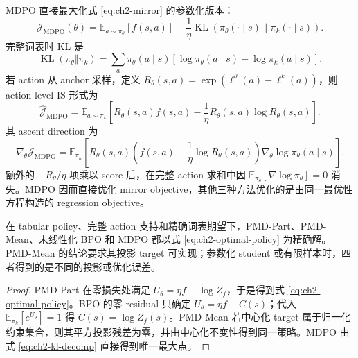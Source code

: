 MDPO 直接最大化式 \eqref{eq:ch2-mirror} 的参数化版本：
\begin{equation}
\label{eq:ch2-mdpo-generic-objective}
\mathcal J_{\mathrm{MDPO}}(\theta)
=\mathbb E_{a\sim\pi_\theta}[f(s,a)]
-\frac1\eta\operatorname{KL}\!\left(\pi_\theta(\cdot\mid s)\middle\Vert\pi_k(\cdot\mid s)\right).
\end{equation}
完整词表时 KL 是
\begin{equation}
\label{eq:ch2-mdpo-full-kl}
\operatorname{KL}(\pi_\theta\Vert\pi_k)
=\sum_a\pi_\theta(a\mid s)
\left[\log\pi_\theta(a\mid s)-\log\pi_k(a\mid s)\right].
\end{equation}
若 action 从 anchor 采样，定义 $R_\theta(s,a)=\exp(\ell^\theta(a)-\ell^k(a))$，则 action-level IS 形式为
\begin{equation}
\label{eq:ch2-mdpo-sample-integrand}
\widehat{\mathcal J}_{\mathrm{MDPO}}
=\mathbb E_{a\sim\pi_k}\left[R_\theta(s,a)f(s,a)-\frac1\eta R_\theta(s,a)\log R_\theta(s,a)\right].
\end{equation}
其 ascent direction 为
\begin{equation}
\label{eq:ch2-mdpo-generic-gradient}
\nabla_\theta\mathcal J_{\mathrm{MDPO}}
=\mathbb E_{\pi_k}\left[R_\theta(s,a)\left(f(s,a)-\frac1\eta\log R_\theta(s,a)\right)\nabla_\theta\log\pi_\theta(a\mid s)\right].
\end{equation}
额外的 $-R_\theta/\eta$ 项乘以 score 后，在完整 action 求和中因 $\mathbb E_{\pi_\theta}[\nabla\log\pi_\theta]=0$ 消失。MDPO 因而直接优化 mirror objective，其他三种方法优化的是由同一最优性方程构造的 regression objective。

\begin{theorem}
\label{thm:ch2-inner-common-root}
在 tabular policy、完整 action 支持和精确词表期望下，PMD-Part、PMD-Mean、未线性化 BPO 和 MDPO 都以式 \eqref{eq:ch2-optimal-policy} 为精确解。PMD-Mean 的结论要求其投影 target 可实现；参数化 student 或有限样本时，四者得到的是不同的投影或优化误差。
\end{theorem}

\begin{proof}
PMD-Part 在零损失处满足 $U_\theta=\eta f-\log Z_f$，于是得到式 \eqref{eq:ch2-optimal-policy}。BPO 的零 residual 只确定 $U_\theta=\eta f-C(s)$；代入 $\mathbb E_{\pi_k}[e^{U_\theta}]=1$ 得 $C(s)=\log Z_f(s)$。PMD-Mean 若中心化 target 属于归一化约束集合，则其平方投影残差为零，并由中心化不变性得到同一策略。MDPO 由式 \eqref{eq:ch2-kl-decomp} 直接得到唯一最大点。
\end{proof}


